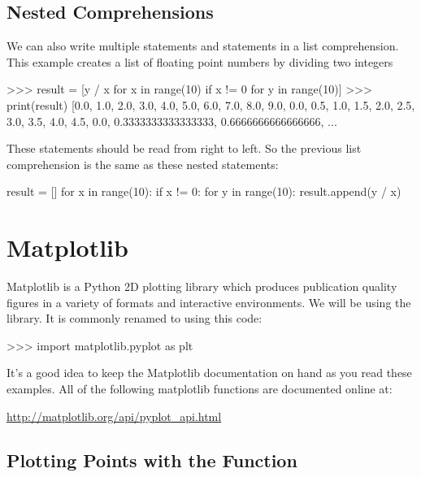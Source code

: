\documentclass[11pt]{cselabheader}
\begin{document}
\subsection{Nested Comprehensions}

We can also write multiple  statements and
 statements in a list comprehension.
This example creates a list of floating point numbers by dividing
two integers

\begin{pyconcode}
>>> result = [y / x for x in range(10) if x != 0 for y in range(10)]
>>> print(result)
[0.0, 1.0, 2.0, 3.0, 4.0, 5.0, 6.0, 7.0, 8.0, 9.0, 0.0, 0.5, 1.0, 1.5,
2.0, 2.5, 3.0, 3.5, 4.0, 4.5, 0.0, 0.3333333333333333, 0.6666666666666666, ...
\end{pyconcode}

These statements should be read from right to left. So the previous list
comprehension is the same as these nested statements:

\begin{python3code}
result = []
for x in range(10):
    if x != 0:
        for y in range(10):
            result.append(y / x)
\end{python3code}

\section{Matplotlib}

Matplotlib is a Python 2D plotting library which produces publication
quality figures in a variety of formats and interactive environments.
We will be using the  library. It is
commonly renamed to  using this code:

\begin{pyconcode}
>>> import matplotlib.pyplot as plt
\end{pyconcode}

It's a good idea to keep the Matplotlib documentation on hand as you read these
examples. All of the following matplotlib functions are documented online at:
\begin{center}
\url{http://matplotlib.org/api/pyplot_api.html}
\end{center}

\subsection{Plotting Points with the  Function}
\end{document}
